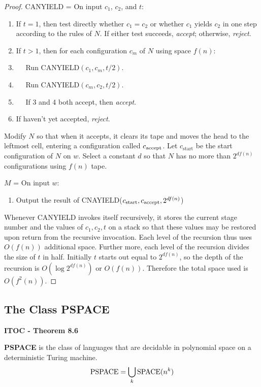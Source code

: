 \begin{mdframed}
\begin{proof}
\medskip
CANYIELD = On input $c_1$, $c_2$, and $t$:
\begin{enumerate}
\item If $t=1$, then test directly whether $c_1 = c_2$ or whether $c_1$ yields $c_2$ in one step according to the rules of $N$. If either test succeeds, \textit{accept}; otherwise, \textit{reject}.
\item If $t>1$, then for each configuration $c_m$ of $N$ using space $f(n)$:
\item $\quad$ Run CANYIELD$(c_1, c_m, t/2)$.
\item $\quad$ Run CANYIELD$(c_m, c_2, t/2)$.
\item $\quad$ If 3 and 4 both accept, then \textit{accept}.
\item If haven't yet accepted, \textit{reject}.
\end{enumerate}

Modify $N$ so that when it accepts, it clears its tape and moves the head to the leftmost cell, entering a configuration called $c_{\text{accept}}$. Let $c_\text{start}$ be the start configuration of $N$ on $w$. Select a constant $d$ so that $N$ has no more than $2^{df(n)}$ configurations using $f(n)$ tape.

\medskip
$M$ = On input $w$:
\begin{enumerate}
\item Output the result of CNAYIELD($c_\text{start}, c_{\text{accept}}, 2^{df(n)}$)
\end{enumerate}

Whenever CANYIELD invokes itself recursively, it stores the current stage number and the values of $c_1, c_2 ,t$ on a stack so that these values may be restored upon return from the recursive invocation. Each level of the recursion thus uses $O(f(n))$ additional space. Further more, each level of the recursion divides the size of $t$ in half. Initially $t$ starts out equal to $2^{df(n)}$, so the depth of the recursion is $O(\log 2^{df(n)})$ or $O(f(n))$. Therefore the total space used is $O(f^2(n))$.
\end{proof}
\end{mdframed}

\subsection{The Class PSPACE}

\begin{shaded}
\textbf{ITOC - Theorem 8.6}

\medskip
\textbf{PSPACE} is the class of languages that are decidable in polynomial space on a deterministic Turing machine.
\[
\text{PSPACE} = \bigcup_k \text{SPACE}(n^k)
\]
\end{shaded}

